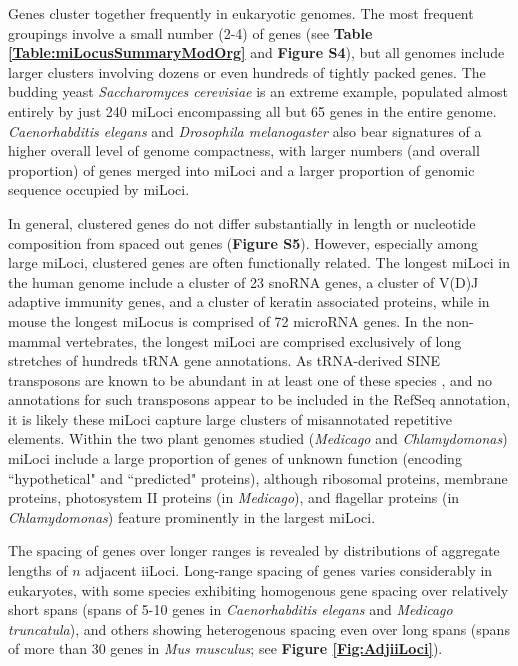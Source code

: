 Genes cluster together frequently in eukaryotic genomes.
The most frequent groupings involve a small number (2-4) of genes (see \textbf{Table \ref{Table:miLocusSummaryModOrg}} and \textbf{Figure S4}), but all genomes include larger clusters involving dozens or even hundreds of tightly packed genes.
The budding yeast \textit{Saccharomyces cerevisiae} is an extreme example, populated almost entirely by just 240 miLoci encompassing all but 65 genes in the entire genome.
\textit{Caenorhabditis elegans} and \textit{Drosophila melanogaster} also bear signatures of a higher overall level of genome compactness, with larger numbers (and overall proportion) of genes merged into miLoci and a larger proportion of genomic sequence occupied by miLoci.

In general, clustered genes do not differ substantially in length or nucleotide composition from spaced out genes (\textbf{Figure S5}).
However, especially among large miLoci, clustered genes are often functionally related.
The longest miLoci in the human genome include a cluster of 23 snoRNA genes, a cluster of V(D)J adaptive immunity genes, and a cluster of keratin associated proteins, while in mouse the longest miLocus is comprised of 72 microRNA genes.
In the non-mammal vertebrates, the longest miLoci are comprised exclusively of long stretches of hundreds tRNA gene annotations.
As tRNA-derived SINE transposons are known to be abundant in at least one of these species \cite{DrerGenome}, and no annotations for such transposons appear to be included in the RefSeq annotation, it is likely these miLoci capture large clusters of misannotated repetitive elements.
Within the two plant genomes studied (\textit{Medicago} and \textit{Chlamydomonas}) miLoci include a large proportion of genes of unknown function (encoding ``hypothetical" and ``predicted" proteins), although ribosomal proteins, membrane proteins, photosystem II proteins (in \textit{Medicago}), and flagellar proteins (in \textit{Chlamydomonas}) feature prominently in the largest miLoci.

The spacing of genes over longer ranges is revealed by distributions of aggregate lengths of $n$ adjacent iiLoci.
Long-range spacing of genes varies considerably in eukaryotes, with some species exhibiting homogenous gene spacing over relatively short spans (spans of 5-10 genes in \textit{Caenorhabditis elegans} and \textit{Medicago truncatula}), and others showing heterogenous spacing even over long spans (spans of more than 30 genes in \textit{Mus musculus}; see \textbf{Figure \ref{Fig:AdjiiLoci}}).

